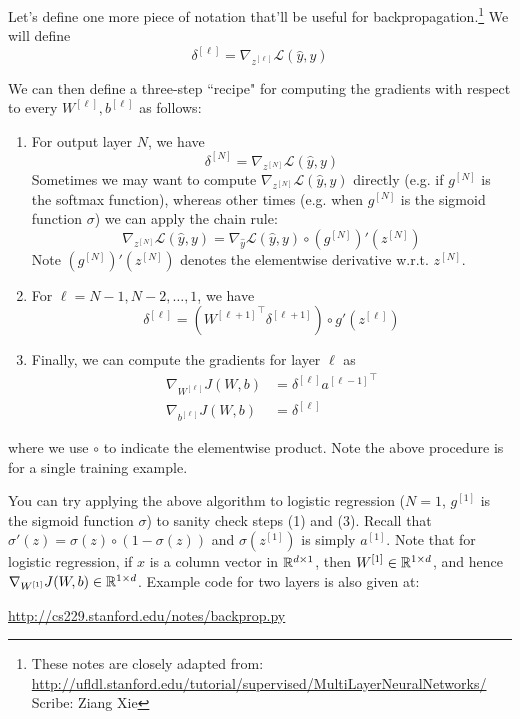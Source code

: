 \documentclass{article}
\numberwithin{equation}{section}
\begin{document}
Let's define one more piece of notation that'll be useful for
backpropagation.\footnote{These notes are closely adapted from:\\\url{http://ufldl.stanford.edu/tutorial/supervised/MultiLayerNeuralNetworks/}\\Scribe: Ziang Xie}
We will define
$$\delta^{[\ell]} = \nabla_{z^{[\ell]}} \mathcal{L}(\hat{y}, y)$$

We can then define a three-step  ``recipe" for computing the gradients with respect to
every $W^{[\ell]}, b^{[\ell]}$ as follows:
\begin{enumerate}
  \item For output layer $N$, we have
    $$\delta^{[N]} = \nabla_{z^{[N]}} \mathcal{L}(\hat{y}, y)$$
    Sometimes we may want to compute $\nabla_{z^{[N]}} \mathcal{L}(\hat{y}, y)$ directly
    (e.g. if $g^{[N]}$ is the softmax function),
    whereas other times (e.g. when $g^{[N]}$ is the sigmoid function $\sigma$)
    we can apply the chain rule:
    $$\nabla_{z^{[N]}} \mathcal{L}(\hat{y}, y) = \nabla_{\hat{y}} \mathcal{L}(\hat{y}, y) \circ (g^{[N]})'(z^{[N]})$$
    Note $(g^{[N]})'(z^{[N]})$ denotes the elementwise derivative w.r.t. $z^{[N]}$.
  \item For $\ell = N-1, N-2, \dots, 1$, we have
    $$\delta^{[\ell]} = ({W^{[\ell+1]}}^\top \delta^{[\ell + 1]}) \circ g'(z^{[\ell]})$$
  \item Finally, we can compute the gradients for layer $\ell$ as
    \begin{align*}
      \nabla_{W^{[\ell]}} J(W, b) &= \delta^{[\ell]} {a^{[\ell-1]}}^\top\\
      \nabla_{b^{[\ell]}} J(W, b) &= \delta^{[\ell]}
    \end{align*}
\end{enumerate}
where we use $\circ$ to indicate the elementwise product.
Note the above procedure is for a single training example.

You can try applying the above algorithm to logistic regression
($N=1$, $g^{[1]}$ is the sigmoid function $\sigma$) to sanity check steps (1) and (3).
Recall that $\sigma'(z) = \sigma(z) \circ (1-\sigma(z))$ and $\sigma(z^{[1]})$ is simply $a^{[1]}$.
Note that for logistic regression, if $x$ is a column vector in $\mathbb{R}^{{d}\times 1}$, then
$W^{[1]} \in \mathbb{R}^{1 \times {d}}$, and hence $\nabla_{W^{[1]}} J(W, b) \in \mathbb{R}^{1 \times {d}}$.
Example code for two layers is also given at:
\begin{center}
\url{http://cs229.stanford.edu/notes/backprop.py}
\end{center}

\end{document}
